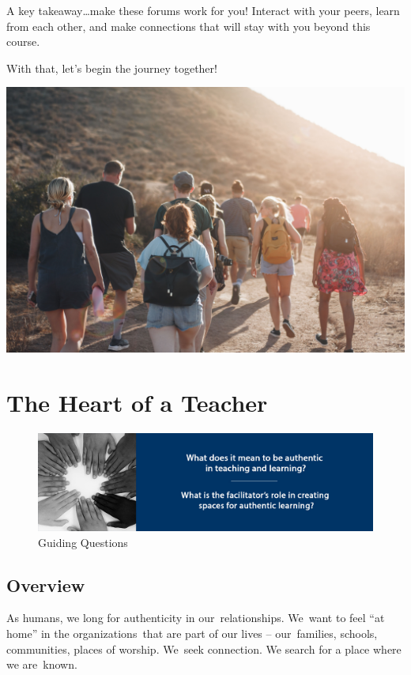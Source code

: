 \documentclass[
]{book}
\begin{document}
A key takeaway\ldots make these forums work for you! Interact with your peers, learn from each other, and make connections that will stay with you beyond this course.

With that, let's begin the journey together!

\includegraphics{assets/community/luke-porter-NEqEC7qa9FM-unsplash.jpg}

\hypertarget{the-heart-of-a-teacher}{%
\chapter{The Heart of a Teacher}\label{the-heart-of-a-teacher}}

\begin{figure}
\centering
\includegraphics{assets/unit1/LDRS664-BannerUnit1.jpg}
\caption{Guiding Questions}
\end{figure}

\hypertarget{overview}{%
\section*{Overview}\label{overview}}

As humans, we long for authenticity in our~relationships. We~want to feel ``at home'' in the organizations~that are part of our lives -- our~families, schools, communities, places of worship. We~seek connection. We search for a place where we are~known.
\end{document}
